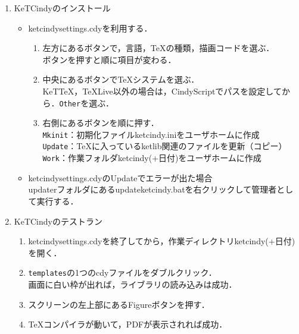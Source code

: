 \documentclass{ujarticle}
\begin{document}
\begin{enumerate}[\bf\large 1.]
\item KeTCindyのインストール
\begin{itemize}
\item ketcindysettings.cdyを利用する．
\begin{enumerate}[(1)]
\item 左方にあるボタンで，言語，TeXの種類，描画コードを選ぶ．\\
\hspace*{10mm}ボタンを押すと順に項目が変わる．
\item 中央にあるボタンでTeXシステムを選ぶ．\\
\hspace*{10mm}KeTTeX，TeXLive以外の場合は，CindyScriptでパスを設定してから．\verb|Other|を選ぶ．
\item 右側にあるボタンを順に押す．\\
\hspace*{10mm}\verb|Mkinit|：初期化ファイルketcindy.iniをユーザホームに作成\\
\hspace*{10mm}\verb|Update|：TeXに入っているketlib関連のファイルを更新（コピー）\\
\hspace*{10mm}\verb|Work|：作業フォルダketcindy(+日付)をユーザホームに作成
\end{enumerate}
\item ketcindysettings.cdyのUpdateでエラーが出た場合\\
\hspace*{10mm}updaterフォルダにあるupdateketcindy.batを右クリックして管理者として実行する．
\end{itemize}

\item KeTCindyのテストラン
    \begin{enumerate}[(1)]
    \item ketcindysettings.cdyを終了してから，作業ディレクトリketcindy(+日付)を開く．
    \item \verb|templates|の1つのcdyファイルをダブルクリック．\\
      \hspace*{10mm}画面に白い枠が出れば，ライブラリの読み込みは成功．
    \item スクリーンの左上部にあるFigureボタンを押す．
    \item \TeX コンパイラが動いて，PDFが表示されれば成功．
  \end{enumerate}


\end{enumerate}
\end{document}
